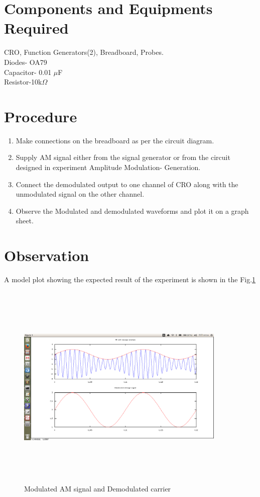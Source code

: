 \documentclass{book}
\begin{document}
\section*{Components and Equipments Required}
CRO, Function Generators(2), Breadboard, Probes.
\\Diodes- OA79
\\Capacitor- 0.01 $\mu$F
\\Resistor-10k$\Omega$
\section*{Procedure}

\begin{enumerate}
\item
Make connections on the breadboard as per the circuit diagram.
\item
Supply AM signal either from the signal generator or from the circuit designed in experiment Amplitude Modulation- Generation. 
\item
Connect the demodulated output to one channel of CRO along with the unmodulated signal on the other channel.
\item
Observe the Modulated and demodulated waveforms and plot it on a graph sheet.
\end{enumerate}
\section*{Observation}
A model plot showing the expected result of the experiment is shown in the Fig.\ref{AMdemod}
\begin{figure}
\includegraphics[width=10cm, height=10cm, trim= 2cm 1cm 1cm 2cm,clip=true]{AMdemod.png}
\caption{Modulated AM signal and Demodulated carrier}
\label{AMdemod}
\end{figure}
\end{document}
